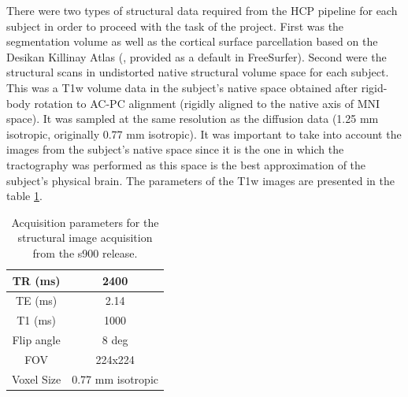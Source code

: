 \documentclass[msthesis.tex]{subfiles}
\begin{document}
There were two types of structural data required from the HCP pipeline for each subject in order to proceed with the task of the project. First was the segmentation volume as well as the cortical surface parcellation based on the Desikan Killinay Atlas (\cite{desikan2006automated}, provided as a default in FreeSurfer). Second were the structural scans in undistorted native structural volume space for each subject. This was a T1w volume data in the subject's native space obtained after rigid-body rotation to AC-PC alignment (rigidly aligned to the native axis of MNI space). It was sampled at the same resolution as the diffusion data (1.25 mm isotropic, originally 0.77 mm isotropic). It was important to take into account the images from the subject's native space since it is the one in which the tractography was performed as this space is the best approximation of the subject's physical brain. The parameters of the T1w images are presented in the table \ref{tab:structuralmri}.
\begin{table}[]
    \centering
    \begin{tabular}{|c|c|}
    \hline
         TR (ms) & 2400  \\
    \hline
         TE (ms) & 2.14 \\
    \hline
         T1 (ms) & 1000 \\
    \hline
         Flip angle & 8 deg \\
    \hline
         FOV & 224x224 \\
    \hline
         Voxel Size & 0.77 mm isotropic \\
    \hline
    \end{tabular}
    \caption{Acquisition parameters for the structural image acquisition from the s900 release. }
    \label{tab:structuralmri}
\end{table}
\end{document}
